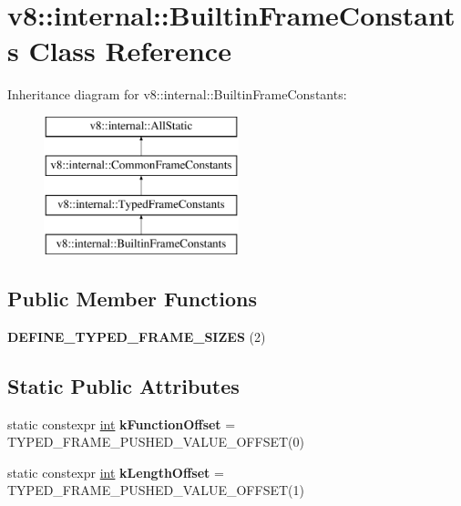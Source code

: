 \hypertarget{classv8_1_1internal_1_1BuiltinFrameConstants}{}\section{v8\+:\+:internal\+:\+:Builtin\+Frame\+Constants Class Reference}
\label{classv8_1_1internal_1_1BuiltinFrameConstants}
Inheritance diagram for v8\+:\+:internal\+:\+:Builtin\+Frame\+Constants\+:\begin{figure}[H]
\begin{center}
\leavevmode
\includegraphics[height=4.000000cm]{classv8_1_1internal_1_1BuiltinFrameConstants}
\end{center}
\end{figure}
\subsection*{Public Member Functions}
\begin{DoxyCompactItemize}
\item 
\mbox{\label{classv8_1_1internal_1_1BuiltinFrameConstants_a688f1f8adf64036a358397d8015393c0}} 
{\bfseries D\+E\+F\+I\+N\+E\+\_\+\+T\+Y\+P\+E\+D\+\_\+\+F\+R\+A\+M\+E\+\_\+\+S\+I\+Z\+ES} (2)
\end{DoxyCompactItemize}
\subsection*{Static Public Attributes}
\begin{DoxyCompactItemize}
\item 
\mbox{\label{classv8_1_1internal_1_1BuiltinFrameConstants_a3b05103959e8c4b161e3da2599bcca5e}} 
static constexpr \mbox{\hyperlink{classint}{int}} {\bfseries k\+Function\+Offset} = T\+Y\+P\+E\+D\+\_\+\+F\+R\+A\+M\+E\+\_\+\+P\+U\+S\+H\+E\+D\+\_\+\+V\+A\+L\+U\+E\+\_\+\+O\+F\+F\+S\+ET(0)
\item 
\mbox{\label{classv8_1_1internal_1_1BuiltinFrameConstants_aaa1da7a36cc884d684167dd2e5d554cd}} 
static constexpr \mbox{\hyperlink{classint}{int}} {\bfseries k\+Length\+Offset} = T\+Y\+P\+E\+D\+\_\+\+F\+R\+A\+M\+E\+\_\+\+P\+U\+S\+H\+E\+D\+\_\+\+V\+A\+L\+U\+E\+\_\+\+O\+F\+F\+S\+ET(1)
\end{DoxyCompactItemize}


